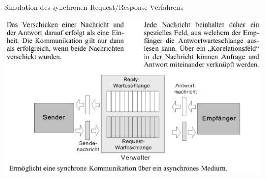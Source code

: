 \begin{frame}{Simulation des synchronen Request/Response-Verfahrens }
    \begin{center}
        \includegraphics[width=\linewidth]{06-architektur/img/mqtt7}
    \end{center}
\end{frame}





